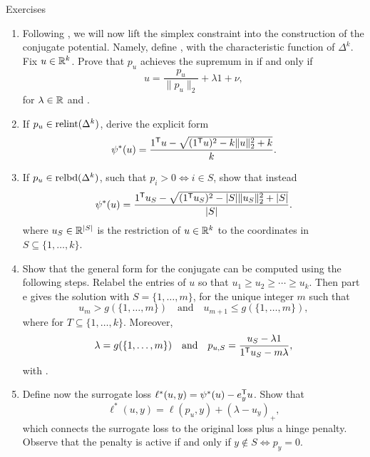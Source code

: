 \begin{xcb}{Exercises}
\begin{enumerate}[label=\thechapter.\arabic*]
\begin{enumerate}[label=\alph*.]
\item Following \cite{blondel2020learning}, we will now lift the simplex
  constraint into the construction of the conjugate potential. Namely, define
  , with  the
  characteristic function of $\Delta^k$. Fix $u \in \mathbb{R}^k$. Prove that $p_u$
  achieves the supremum in  if and only  
  if 
  \[
  u = \frac{p_u}{\|p_u\|_2} + \lambda 1 + \nu,
  \]
  for $\lambda \in \mathbb{R}$ and . 

\item If $p_u \in \operatorname{relint}(\Delta^k)$, derive the explicit form
  \[
  \psi^*(u) = \frac{1^{\mathsf{T}} u - \sqrt{(1^{\mathsf{T}} u)^2 - k \|u\|_2^2 + k}}{k}.
  \]

\item If $p_u \in \operatorname{relbd}(\Delta^k)$, such that $p_i > 0 \iff i \in S$, show that
  instead 
  \[
  \psi^*(u) = \frac{1^{\mathsf{T}} u_S - \sqrt{(1^{\mathsf{T}} u_S)^2 - |S| \|u_S\|_2^2 +
      |S|}}{|S|}.  
  \]
  where $u_S \in \mathbb{R}^{|S|}$ is the restriction of $u \in \mathbb{R}^k$ to the coordinates
  in $S \subseteq \{1,\dots,k\}$.  

\item Show that the general form for the conjugate can be computed using the
  following steps. Relabel the entries of $u$ so that $u_1 \geq u_2 \geq \cdots
  \geq u_k$. Then part e gives the solution with $S = \{1,\dots,m\}$, for the
  unique integer $m$ such that  
  \[
  u_m > g(\{1,\dots,m\}) \quad \text{and} \quad u_{m+1} \leq g(\{1,\dots,m\}), 
  \]
  where  for $T \subseteq \{1,\dots,k\}$. Moreover, 
  \[
  \lambda = g(\{1,\dots,m\}) \quad \text{and} \quad
  p_{u,S} = \frac{u_S - \lambda 1}{1^{\mathsf{T}} u_S - m \lambda},
  \]
  with . 

\item Define now the surrogate loss $\ell^*(u,y) = \psi^*(u) - e_y^{\mathsf{T}} u$. Show
  that 
  \[
  \ell^*(u,y) = \ell(p_u,y) + (\lambda - u_y)_+,
  \]
  which connects the surrogate loss to the original loss plus a hinge
  penalty. Observe that the penalty is active if and only if $y \notin S \iff
  p_y = 0$. 
\end{enumerate}


\end{enumerate}
\end{xcb}
